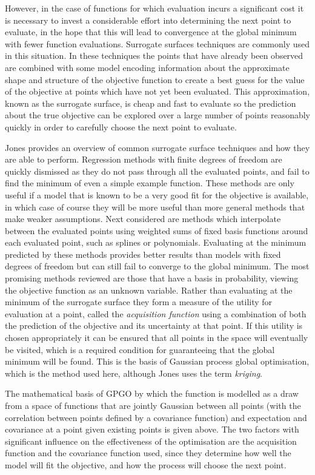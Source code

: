 \documentclass[a4paper, 10 pt, conference]{ieeeconf}  %
\begin{document}
However, in the case of functions for which evaluation incurs a significant cost it is necessary to invest a considerable effort into determining the next point to evaluate, in the hope that this will lead to convergence at the global minimum with fewer function evaluations. Surrogate surfaces techniques are commonly used in this situation. In these techniques the points that have already been observed are combined with some model encoding information about the approximate shape and structure of the objective function to create a best guess for the value of the objective at points which have not yet been evaluated. This approximation, known as the surrogate surface, is cheap and fast to evaluate so the prediction about the true objective can be explored over a large number of points reasonably quickly in order to carefully choose the next point to evaluate.

Jones \cite{jones2001taxonomy} provides an overview of common surrogate surface techniques and how they are able to perform. Regression methods with finite degrees of freedom are quickly dismissed as they do not pass through all the evaluated points, and fail to find the minimum of even a simple example function. These methods are only useful if a model that is known to be a very good fit for the objective is available, in which case of course they will be more useful than more general methods that make weaker assumptions.
Next considered are methods which interpolate between the evaluated points using weighted sums of fixed basis functions around each evaluated point, such as splines or polynomials. Evaluating at the minimum predicted by these methods provides better results than models with fixed degrees of freedom but can still fail to converge to the global minimum.
The most promising methods reviewed are those that have a basis in probability, viewing the objective function as an unknown variable. Rather than evaluating at the minimum of the surrogate surface they form a measure of the utility for evaluation at a point, called the \emph{acquisition function} using a combination of both the prediction of the objective and its uncertainty at that point. If this utility is chosen appropriately it can be ensured that all points in the space will eventually be visited, which is a required condition for guaranteeing that the global minimum will be found. This is the basis of Gaussian process global optimisation, which is the method used here, although Jones uses the term \emph{kriging}.

The mathematical basis of GPGO by which the function is modelled as a draw from a space of functions that are jointly Gaussian between all points (with the correlation between points defined by a covariance function) and expectation and covariance at a point given existing points is given above. The two factors with significant influence on the effectiveness of the optimisation are the acquisition function and the covariance function used, since they determine how well the model will fit the objective, and how the process will choose the next point.
\end{document}
